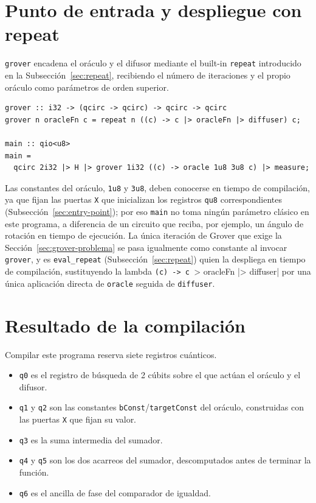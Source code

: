 \section{Punto de entrada y despliegue con repeat}
\label{sec:grover-main}

\lstinline|grover| encadena el oráculo y el difusor mediante el built-in \lstinline|repeat| introducido en la Subsección~\ref{sec:repeat}, recibiendo el número de iteraciones y el propio oráculo como parámetros de orden superior.

\begin{lstlisting}[language={}, caption=Iteración de Grover parametrizada por el número de rondas y el oráculo]
grover :: i32 -> (qcirc -> qcirc) -> qcirc -> qcirc
grover n oracleFn c = repeat n ((c) -> c |> oracleFn |> diffuser) c;

main :: qio<u8>
main =
  qcirc 2i32 |> H |> grover 1i32 ((c) -> oracle 1u8 3u8 c) |> measure;
\end{lstlisting}

Las constantes del oráculo, \lstinline|1u8| y \lstinline|3u8|, deben conocerse en tiempo de compilación, ya que fijan las puertas \lstinline|X| que inicializan los registros \lstinline|qu8| correspondientes (Subsección~\ref{sec:entry-point}); por eso \lstinline|main| no toma ningún parámetro clásico en este programa, a diferencia de un circuito que reciba, por ejemplo, un ángulo de rotación en tiempo de ejecución. La única iteración de Grover que exige la Sección~\ref{sec:grover-problema} se pasa igualmente como constante al invocar \lstinline|grover|, y es \lstinline|eval_repeat| (Subsección~\ref{sec:repeat}) quien la despliega en tiempo de compilación, sustituyendo la lambda \lstinline|(c) -> c |> oracleFn |> diffuser| por una única aplicación directa de \lstinline|oracle| seguida de \lstinline|diffuser|.

\section{Resultado de la compilación}
\label{sec:grover-resultado}

Compilar este programa reserva siete registros cuánticos.

\begin{itemize}
  \item \lstinline|q0| es el registro de búsqueda de 2 cúbits sobre el que actúan el oráculo y el difusor.
  \item \lstinline|q1| y \lstinline|q2| son las constantes \lstinline|bConst|/\lstinline|targetConst| del oráculo, construidas con las puertas \lstinline|X| que fijan su valor.
  \item \lstinline|q3| es la suma intermedia del sumador.
  \item \lstinline|q4| y \lstinline|q5| son los dos acarreos del sumador, descomputados antes de terminar la función.
  \item \lstinline|q6| es el ancilla de fase del comparador de igualdad.
\end{itemize}

